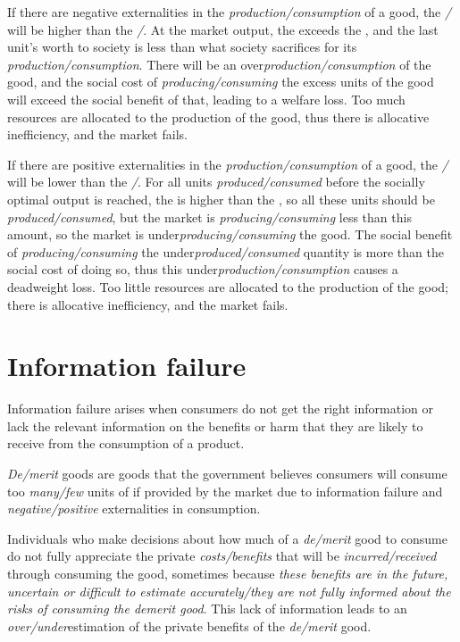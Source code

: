 \documentclass[Economics.tex]{subfiles}
\begin{document}
If there are negative externalities in the \emph{production\slash{}consumption} of a good, the \emph{\slash{}} will be higher than the \emph{\slash{}}. At the market output, the  exceeds the , and the last unit's worth to society is less than what society sacrifices for its \emph{production\slash{}consumption}. There will be an over\emph{production\slash{}consumption} of the good, and the social cost of \emph{producing\slash{}consuming} the excess units of the good will exceed the social benefit of that, leading to a welfare loss. Too much resources are allocated to the production of the good, thus there is allocative inefficiency, and the market fails.

If there are positive externalities in the \emph{production\slash{}{\-}consumption} of a good, the \emph{\slash{}{\-}} will be lower than the \emph{\slash{}{\-}}. For all units \emph{produced\slash{}{\-}consumed} before the socially optimal output is reached, the  is higher than the , so all these units should be \emph{produced\slash{}{\-}consumed}, but the market is \emph{producing\slash{}{\-}consuming} less than this amount, so the market is under\emph{producing\slash{}{\-}consuming} the good. The social benefit of \emph{producing\slash{}{\-}consuming} the under\emph{produced\slash{}{\-}consumed} quantity is more than the social cost of doing so, thus this under\emph{production\slash{}{\-}consumption} causes a deadweight loss. Too little resources are allocated to the production of the good; there is allocative inefficiency, and the market fails.
\section{Information failure}
Information failure arises when consumers do not get the right information or lack the relevant information on the benefits or harm that they are likely to receive from the consumption of a product.

\emph{De\slash{}merit} goods are goods that the government believes consumers will consume too \emph{many\slash{}few} units of if provided by the market due to information failure and \emph{negative\slash{}positive} externalities in consumption.

Individuals who make decisions about how much of a \emph{de\slash{}merit} good to consume do not fully appreciate the private \emph{costs\slash{}benefits} that will be \emph{incurred\slash{}received} through consuming the good, sometimes because \emph{these benefits are in the future, uncertain or difficult to estimate accurately\slash{}they are not fully informed about the risks of consuming the demerit good}. This lack of information leads to an \emph{over\slash{}under}estimation of the private benefits of the \emph{de\slash{}merit} good.
\end{document}
